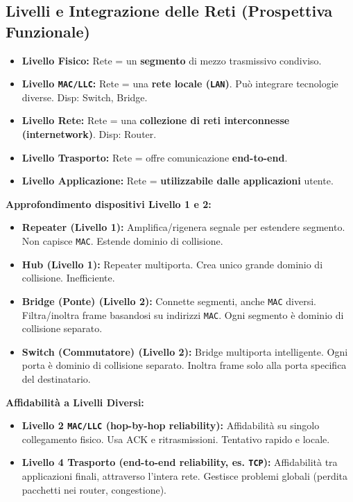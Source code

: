 \documentclass{article}
\begin{document}
\subsection{Livelli e Integrazione delle Reti (Prospettiva Funzionale)}
\begin{itemize}
    \item \textbf{Livello Fisico:} Rete = un \textbf{segmento} di mezzo trasmissivo condiviso.
    \item \textbf{Livello \texttt{MAC/LLC}:} Rete = una \textbf{rete locale (\texttt{LAN})}. Può integrare tecnologie diverse. Disp: Switch, Bridge.
    \item \textbf{Livello Rete:} Rete = una \textbf{collezione di reti interconnesse (internetwork)}. Disp: Router.
    \item \textbf{Livello Trasporto:} Rete = offre comunicazione \textbf{end-to-end}.
    \item \textbf{Livello Applicazione:} Rete = \textbf{utilizzabile dalle applicazioni} utente.
\end{itemize}

\textbf{Approfondimento dispositivi Livello 1 e 2:}
\begin{itemize}
    \item \textbf{Repeater (Livello 1):} Amplifica/rigenera segnale per estendere segmento. Non capisce \texttt{MAC}. Estende dominio di collisione.
    \item \textbf{Hub (Livello 1):} Repeater multiporta. Crea unico grande dominio di collisione. Inefficiente.
    \item \textbf{Bridge (Ponte) (Livello 2):} Connette segmenti, anche \texttt{MAC} diversi. Filtra/inoltra frame basandosi su indirizzi \texttt{MAC}. Ogni segmento è dominio di collisione separato.
    \item \textbf{Switch (Commutatore) (Livello 2):} Bridge multiporta intelligente. Ogni porta è dominio di collisione separato. Inoltra frame solo alla porta specifica del destinatario.
\end{itemize}

\textbf{Affidabilità a Livelli Diversi:}
\begin{itemize}
    \item \textbf{Livello 2 \texttt{MAC/LLC} (hop-by-hop reliability):} Affidabilità su singolo collegamento fisico. Usa ACK e ritrasmissioni. Tentativo rapido e locale.
    \item \textbf{Livello 4 Trasporto (end-to-end reliability, es. \texttt{TCP}):} Affidabilità tra applicazioni finali, attraverso l'intera rete. Gestisce problemi globali (perdita pacchetti nei router, congestione).
\end{itemize}
\end{document}
